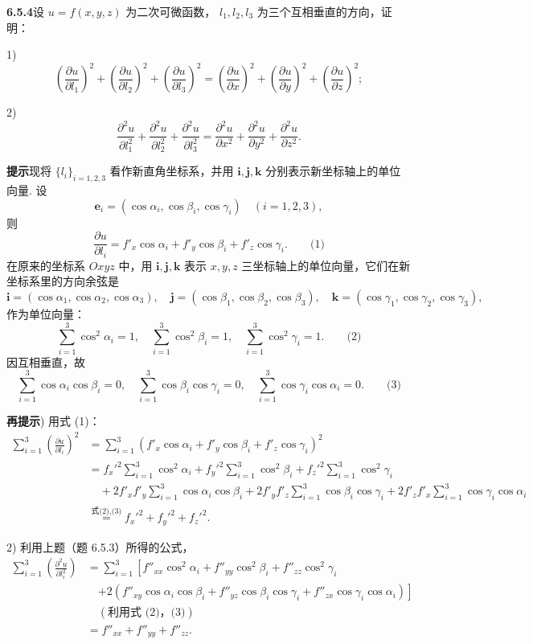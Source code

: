 \documentclass[UTF8,12pt,a4paper,fontset=fandol]{ctexart}
\begin{document}
\noindent\textbf{6.5.4}\quad 设 $u=f(x,y,z)$ 为二次可微函数，
$l_1,l_2,l_3$ 为三个互相垂直的方向，证明：

1)
\[
  \left(\frac{\partial u}{\partial l_1}\right)^2+
  \left(\frac{\partial u}{\partial l_2}\right)^2+
  \left(\frac{\partial u}{\partial l_3}\right)^2
  =
  \left(\frac{\partial u}{\partial x}\right)^2+
  \left(\frac{\partial u}{\partial y}\right)^2+
  \left(\frac{\partial u}{\partial z}\right)^2;
\]

2)
\[
  \frac{\partial^2u}{\partial l_1^2}+
  \frac{\partial^2u}{\partial l_2^2}+
  \frac{\partial^2u}{\partial l_3^2}
  =
  \frac{\partial^2u}{\partial x^2}+
  \frac{\partial^2u}{\partial y^2}+
  \frac{\partial^2u}{\partial z^2}.
\]

\noindent\textbf{提示}\quad 现将 $\{l_i\}_{i=1,2,3}$ 看作新直角坐标系，并用
$\mathbf i,\mathbf j,\mathbf k$ 分别表示新坐标轴上的单位向量. 设
\[
  \mathbf e_i=(\cos\alpha_i,\cos\beta_i,\cos\gamma_i)\quad(i=1,2,3),
\]
则
\[
  \frac{\partial u}{\partial l_i}
  =
  f'_x\cos\alpha_i+f'_y\cos\beta_i+f'_z\cos\gamma_i. \qquad\text{(1)}
\]
在原来的坐标系 $Oxyz$ 中，用 $\mathbf i,\mathbf j,\mathbf k$ 表示 $x,y,z$ 三坐标轴上的单位向量，它们在新坐标系里的方向余弦是
\[
  \mathbf i=(\cos\alpha_1,\cos\alpha_2,\cos\alpha_3),\quad
  \mathbf j=(\cos\beta_1,\cos\beta_2,\cos\beta_3),\quad
  \mathbf k=(\cos\gamma_1,\cos\gamma_2,\cos\gamma_3),
\]
作为单位向量：
\[
  \sum_{i=1}^3\cos^2\alpha_i=1,\quad
  \sum_{i=1}^3\cos^2\beta_i=1,\quad
  \sum_{i=1}^3\cos^2\gamma_i=1. \qquad\text{(2)}
\]
因互相垂直，故
\[
  \sum_{i=1}^3\cos\alpha_i\cos\beta_i=0,\quad
  \sum_{i=1}^3\cos\beta_i\cos\gamma_i=0,\quad
  \sum_{i=1}^3\cos\gamma_i\cos\alpha_i=0. \qquad\text{(3)}
\]

\noindent\textbf{再提示}) 用式 (1)：
\[
\begin{aligned}
  \sum_{i=1}^3\left(\frac{\partial u}{\partial l_i}\right)^2
  &=
  \sum_{i=1}^3(f'_x\cos\alpha_i+f'_y\cos\beta_i+f'_z\cos\gamma_i)^2\\
  &=
  f_x'^2\sum_{i=1}^3\cos^2\alpha_i+
  f_y'^2\sum_{i=1}^3\cos^2\beta_i+
  f_z'^2\sum_{i=1}^3\cos^2\gamma_i\\
  &\quad+
  2f'_xf'_y\sum_{i=1}^3\cos\alpha_i\cos\beta_i+
  2f'_yf'_z\sum_{i=1}^3\cos\beta_i\cos\gamma_i+
  2f'_zf'_x\sum_{i=1}^3\cos\gamma_i\cos\alpha_i\\
  &\overset{\text{式(2),(3)}}{=}
  f_x'^2+f_y'^2+f_z'^2.
\end{aligned}
\]

2) 利用上题（题 6.5.3）所得的公式，
\[
\begin{aligned}
  \sum_{i=1}^3\left(\frac{\partial^2u}{\partial l_i^2}\right)
  &=
  \sum_{i=1}^3
  \left[
  f''_{xx}\cos^2\alpha_i+
  f''_{yy}\cos^2\beta_i+
  f''_{zz}\cos^2\gamma_i\right.\\
  &\quad\left.
  +2\left(
  f''_{xy}\cos\alpha_i\cos\beta_i+
  f''_{yz}\cos\beta_i\cos\gamma_i+
  f''_{zx}\cos\gamma_i\cos\alpha_i
  \right)\right]\\
  &\quad(\text{利用式 (2)，(3)})\\
  &=f''_{xx}+f''_{yy}+f''_{zz}.
\end{aligned}
\]
\end{document}
